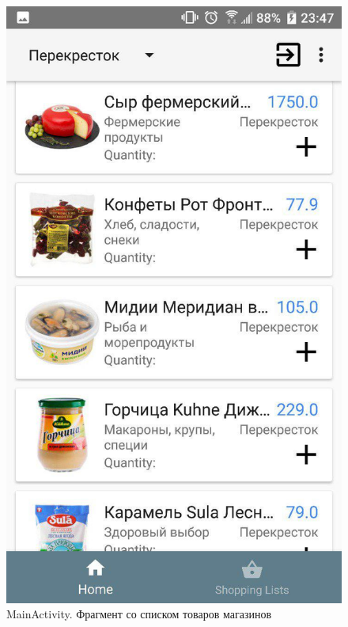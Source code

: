 \begin{my_enumerate}
\begin{figure}[h!]
            \includegraphics[height=0.42\textheight]{./screenshots/3/home.jpg}
            \caption{\small{MainActivity. Фрагмент со списком товаров магазинов}}
            \label{home_fragment}
            \endminipage\hfill

\end{figure}
\end{my_enumerate}
